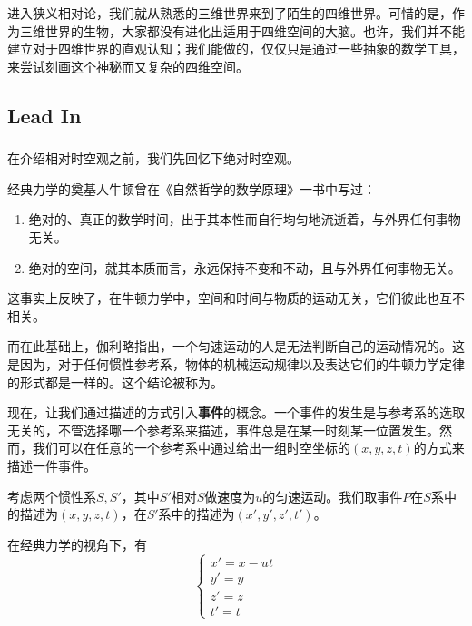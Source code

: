\chapter[狭义相对论]{}
进入狭义相对论，我们就从熟悉的三维世界来到了陌生的四维世界。可惜的是，作为三维世界的生物，大家都没有进化出适用于四维空间的大脑。也许，我们并不能建立对于四维世界的直观认知；我们能做的，仅仅只是通过一些抽象的数学工具，来尝试刻画这个神秘而又复杂的四维空间。
\section[引入]{Lead In}
\subsection[绝对时空观]{}
在介绍相对时空观之前，我们先回忆下绝对时空观。

经典力学的奠基人牛顿曾在《自然哲学的数学原理》一书中写过：
\begin{enumerate}
	\item 绝对的、真正的数学时间，出于其本性而自行均匀地流逝着，与外界任何事物无关。
	\item 绝对的空间，就其本质而言，永远保持不变和不动，且与外界任何事物无关。
\end{enumerate}

这事实上反映了，在牛顿力学中，空间和时间与物质的运动无关，它们彼此也互不相关。

而在此基础上，伽利略指出，一个匀速运动的人是无法判断自己的运动情况的。这是因为，对于任何惯性参考系，物体的机械运动规律以及表达它们的牛顿力学定律的形式都是一样的。这个结论被称为。

现在，让我们通过描述的方式引入\textbf{事件}的概念。一个事件的发生是与参考系的选取无关的，不管选择哪一个参考系来描述，事件总是在某一时刻某一位置发生。然而，我们可以在任意的一个参考系中通过给出一组时空坐标的$(x,y,z,t)$的方式来描述一件事件。


考虑两个惯性系$S,S'$，其中$S'$相对$S$做速度为$u$的匀速运动。我们取事件$P$在$S$系中的描述为$(x,y,z,t)$，在$S'$系中的描述为$(x',y',z',t')$。

在经典力学的视角下，有
\begin{equation}
	\left\{
	\begin{array}{l}
		x'=x-ut\\
		y'=y\\
		z'=z\\
		t'=t
	\end{array}
	\right.
\end{equation}

